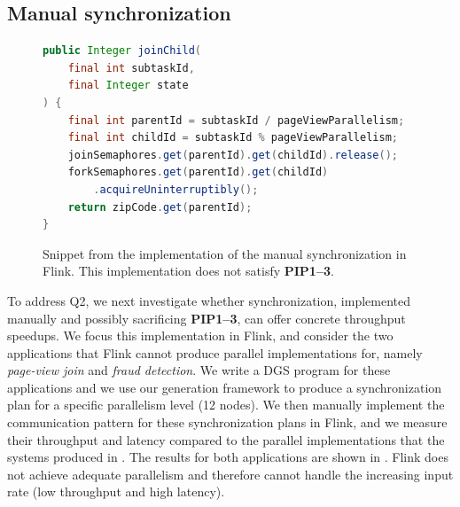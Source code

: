 \subsection{Manual synchronization}
\label{dgs:ssec:performance-evaluation}

\begin{figure}[t]
  \centering
  \begin{minipage}{0.9\textwidth}
  \begin{lstlisting}[language=Java,basicstyle=\small\ttfamily,commentstyle=\scriptsize\ttfamily,morekeywords={var}]
public Integer joinChild(
    final int subtaskId,
    final Integer state
) {
    final int parentId = subtaskId / pageViewParallelism;
    final int childId = subtaskId % pageViewParallelism;
    joinSemaphores.get(parentId).get(childId).release();
    forkSemaphores.get(parentId).get(childId)
        .acquireUninterruptibly();
    return zipCode.get(parentId);
}
  \end{lstlisting}
  \end{minipage}
  \caption[Flink code snippet.]{Snippet from the implementation of the manual synchronization  in Flink. This implementation does not satisfy \textbf{PIP1--3}.}
  \label{dgs:fig:flink-snippet}
\end{figure}

\noindent
To address Q2, we next investigate whether synchronization, implemented manually and possibly sacrificing \textbf{PIP1--3}, can offer concrete throughput speedups.
We focus this implementation in Flink, and consider the two applications that Flink cannot produce parallel implementations for, namely \emph{page-view join} and \emph{fraud detection}. We write a DGS program for these applications and we use our generation framework to produce a synchronization plan for a specific parallelism level (12 nodes). We then manually implement the communication pattern for these synchronization plans in Flink, and we measure their throughput and latency compared to the parallel implementations that the systems produced in . The results for both applications are shown in . Flink does not achieve adequate parallelism and therefore cannot handle the increasing input rate (low throughput and high latency).

